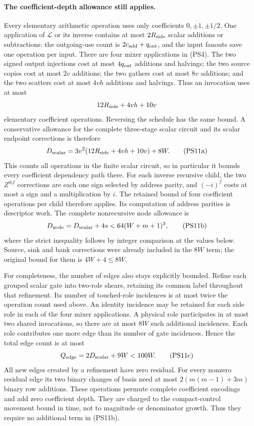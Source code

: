 \paragraph{The coefficient-depth allowance still applies.}
Every elementary arithmetic operation uses only coefficients
$0,\pm1,\pm1/2$.  One application of $\mathcal L$ or its inverse
contains at most $2R_{\rm side}$ scalar additions or subtractions:
the outgoing-use count is $2c_{\rm add}+q_{\rm out}$, and the
input fanouts save one operation per input.  There are four mixer
applications in (PS4).  The two signed output injections cost at most
$4q_{\rm out}$ additions and halvings; the two source copies cost
at most $2v$ additions; the two gathers cost at most $8v$ additions;
and the two scatters cost at most $4vh$ additions and halvings.
Thus an invocation uses at most
\[
 12R_{\rm side}+4vh+10v
\]
elementary coefficient operations.  Reversing the schedule has the same
bound.  A conservative allowance for the complete three-stage scalar
circuit and its scalar endpoint corrections is therefore
\[
 D_{\rm scalar}
 =3v^2(12R_{\rm side}+4vh+10v)+8W.                              \tag{PS11a}
\]
This counts all operations in the finite scalar circuit, so in particular
it bounds every coefficient dependency path there.  For each inverse
recursive child, the two $Z^{\otimes f}$ corrections are each one sign
selected by address parity, and $(-i)^f$ costs at most a sign and a
multiplication by $i$.  The retained bound of four coefficient operations
per child therefore applies.  Its computation of address parities is
descriptor work.  The complete nonrecursive node allowance is
\[
 D_{\rm node}=D_{\rm scalar}+4s<64(W+m+1)^3,                    \tag{PS11b}
\]
where the strict inequality follows by integer comparison at the values
below.  Source, sink and bank corrections were already included in the
$8W$ term; the original bound for them is $4W+4\le8W$.

For completeness, the number of edges also stays explicitly bounded.
Refine each grouped scalar gate into two-role shears, retaining its common
label throughout that refinement.  Its number of touched-role incidences
is at most twice the operation count used above.  An identity incidence
may be retained for each side role in each of the four mixer applications.
A physical role participates in at most two shared invocations, so there
are at most $8W$ such additional incidences.  Each role contributes one
more edge than its number of gate incidences.  Hence the total edge count
is at most
\[
 Q_{\rm edge}=2D_{\rm scalar}+9W<100W.                          \tag{PS11c}
\]
All new edges created by a refinement have zero residual.  For every
nonzero residual edge its two binary changes of basis need at most
$2(m(m-1)+3m)$ binary row additions.  These operations permute complete
coefficient encodings and add zero coefficient depth.  They are charged
to the compact-control movement bound in time, not to magnitude or
denominator growth.  Thus they require no additional term in (PS11b).

